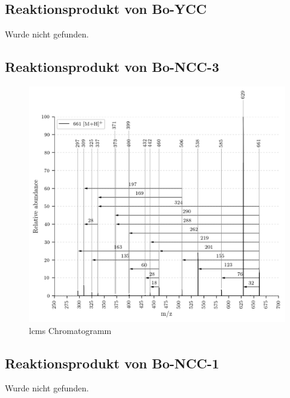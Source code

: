 \subsection{Reaktionsprodukt von Bo-YCC}

Wurde nicht gefunden.

\subsection{Reaktionsprodukt von Bo-NCC-3}

\begin{figure}[!htbp]
  \centering
  \includegraphics[width=\textwidth, height=0.7\textwidth]{figures/Kapitel7/Kataboliten/VWA_MS_661.png}
  \caption[LC-MS Chromatogramm vor der Reaktion, Quelle: Author]{\gls{lcms} Chromatogramm}
  \label{fig:LCMSChromatogramm}
\end{figure}

\subsection{Reaktionsprodukt von Bo-NCC-1}

Wurde nicht gefunden.
